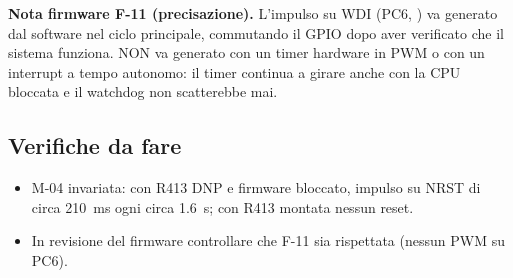 \begin{notebox}
\textbf{Nota firmware F-11 (precisazione).} L'impulso su WDI (PC6, ) va generato dal software nel ciclo principale, commutando il GPIO dopo aver verificato che il sistema funziona. NON va generato con un timer hardware in PWM o con un interrupt a tempo autonomo: il timer continua a girare anche con la CPU bloccata e il watchdog non scatterebbe mai.
\end{notebox}

\subsection{Verifiche da fare}
\begin{itemize}
\item M-04 invariata: con R413 DNP e firmware bloccato, impulso su NRST di circa \SI{210}{\milli\second} ogni circa \SI{1,6}{\second}; con R413 montata nessun reset.
\item In revisione del firmware controllare che F-11 sia rispettata (nessun PWM su PC6).
\end{itemize}

